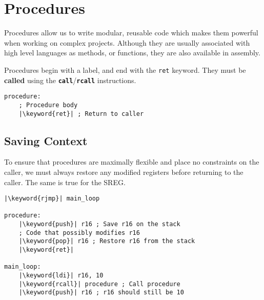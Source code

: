 \documentclass[a4paper]{report}
\newcommand{\keyword}[1]{\textcolor[rgb]{0.00,0.50,0.00}{\textbf{#1}}}
\newcommand{\keywordinline}[1]{\textcolor[rgb]{0.00,0.50,0.00}{\textbf{\texttt{#1}}}}
\begin{document}
\section{Procedures}
Procedures allow us to write modular, reusable code which makes them
powerful when working on complex projects. Although they are usually
associated with high level languages as methods, or functions, they are
also available in assembly.

Procedures begin with a label, and end with the \texttt{ret}
keyword. They must be \textbf{called} using the
\keywordinline{call}/\keywordinline{rcall} instructions.
\begin{verbatim}
procedure:
    ; Procedure body
    |\keyword{ret}| ; Return to caller
\end{verbatim}
\subsection{Saving Context}
To ensure that procedures are maximally flexible and place no
constraints on the caller, we must always restore any modified
registers before returning to the caller. The same is true for the
SREG\@.
\begin{verbatim}
|\keyword{rjmp}| main_loop

procedure:
    |\keyword{push}| r16 ; Save r16 on the stack
    ; Code that possibly modifies r16
    |\keyword{pop}| r16 ; Restore r16 from the stack
    |\keyword{ret}|

main_loop:
    |\keyword{ldi}| r16, 10
    |\keyword{rcall}| procedure ; Call procedure
    |\keyword{push}| r16 ; r16 should still be 10
\end{verbatim}
\end{document}
